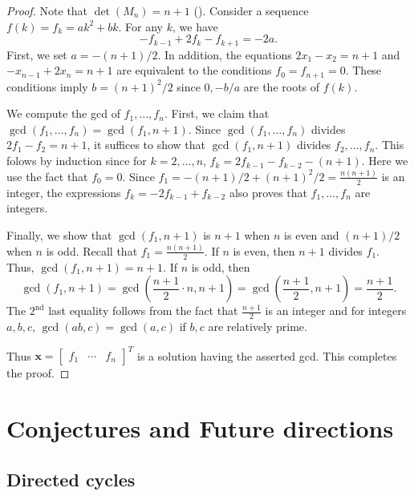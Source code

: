 \documentclass[11pt,reqno]{amsart}
\theoremstyle{definition}
\theoremstyle{plain}
\begin{document}
\begin{proof}
Note that $\det (M_n) = n+1$ (). 
Consider a sequence $f(k)=f_k  = ak^2 + bk$. 
For any $k$, we have
\[
-f_{k-1} + 2f_k - f_{k+1} = -2a.
\]
First, we set $a = -(n+1)/2$. 
In addition, the equations $2x_1 - x_2 = n+1$ and $-x_{n-1} + 2x_n = n+1$ are equivalent to the conditions $f_0 = f_{n+1} = 0$. 
These conditions imply $b = (n+1)^2/2$ since $0, -b/a$ are the roots of $f(k)$. 

We compute the gcd of $f_1,\dots, f_n$. 
First, we claim that $\gcd(f_1,\dots, f_n) = \gcd(f_1, n+1)$. 
Since $\gcd(f_1,\dots, f_n)$ divides $2f_1-f_2 = n+1$, 
it suffices to show that $\gcd(f_1, n+1)$ divides $f_2,\dots, f_n$. 
This folows by induction since for $k = 2, \dots, n$, 
$f_k = 2 f_{k-1} - f_{k-2} - (n+1)$.
Here we use the fact that $f_0 = 0$. 
Since $f_1 =  -(n+1)/2 + (n+1)^2/2 = \frac{n(n+1)}2$ is an integer, the expressions $f_k = -2 f_{k-1} + f_{k-2}$ also proves that $f_1, \dots, f_n$ are integers. 

Finally, we show that $\gcd(f_1, n+1)$ is $n+1$ when $n$ is even and $(n+1)/2$ when $n$ is odd. 
Recall that $f_1 = \frac{n(n+1)}2$.
If $n$ is even, then $n+1$ divides $f_1$. 
Thus, $\gcd(f_1, n+1) = n+1$. 
If $n$ is odd, then 
\[
\gcd(f_1, n+1) = \gcd(\frac{n+1}2 \cdot n, n+1) = \gcd(\frac{n+1}2, n+1) = \frac{n+1}2.
\] 
The $2^\textrm{nd}$ last equality follows from the fact that $\frac{n+1}2$ is an integer and for integers $a,b,c$, $\gcd(ab,c) = \gcd(a,c)$ if $b,c$ are relatively prime. 

Thus $\mathbf{x} = \begin{bmatrix} f_1 & \cdots & f_n \end{bmatrix}^T$ is a solution having the asserted gcd. 
This completes the proof. 
\end{proof}







\section{Conjectures and Future directions} \label{section: conjecture}

\subsection{Directed cycles}
\end{document}

